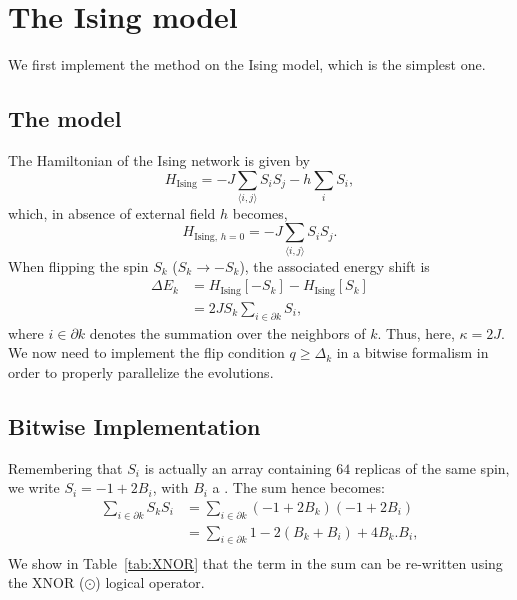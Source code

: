 \section{The Ising model}
We first implement the method on the Ising model, which is the simplest one.
\subsection{The model}
The Hamiltonian of the Ising network is given by
\begin{equation*}
  H_\text{Ising}=-J\sum_{\langle i,j \rangle}S_iS_j -h \sum_i S_i,
\end{equation*}
which, in absence of external field $h$ becomes,
\begin{equation}
  H_{\text{Ising, } h=0}=-J\sum_{\langle i,j \rangle}S_iS_j.
  \label{eq:ising}
\end{equation}
When flipping the spin $S_k$ ($S_k \to - S_k$), the associated energy shift is
\begin{equation}
\begin{aligned}
  \Delta E_k &= H_\text{Ising}\left[-S_k\right]-H_\text{Ising}\left[S_k\right] \\
  &= 2J S_k \sum_{i \in \partial k} S_i,
\end{aligned}
\label{eq:DeltaE_ising}
\end{equation}
where $i \in \partial k$ denotes the summation over the neighbors of $k$. Thus, here, $\kappa=2J$. We now need to implement the flip condition $q \geq \Delta_k$ in a bitwise formalism in order to properly parallelize the evolutions.
\subsection{Bitwise Implementation}
Remembering that $S_i$ is actually an array containing $64$ replicas of the same spin, we write $S_i = -1 + 2B_i$, with $B_i$ a \Bits. The sum hence becomes:
\begin{equation*}
\begin{aligned}
  \sum_{i \in \partial k}S_k S_i&=\sum_{i \in \partial k} (-1+2B_k)(-1+2B_i)\\
                          &=\sum_{i \in \partial k} 1-2 (B_k+B_i) +4 B_k.B_i,\\
\end{aligned}
\end{equation*}
We show in Table~\ref{tab:XNOR} that the term in the sum can be re-written using the XNOR ($\odot$) logical operator.

